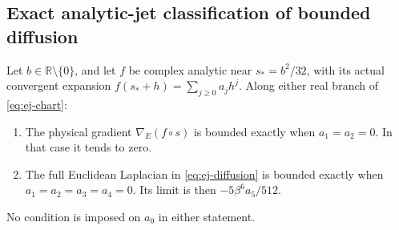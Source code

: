 \subsection{Exact analytic-jet classification of bounded diffusion}

\begin{theorem}\label{thm:ej-jets}
Let $b\in\mathbb R\setminus\{0\}$, and let $f$ be complex analytic
near $s_*=b^2/32$, with its actual convergent expansion
$f(s_*+h)=\sum_{j\ge0}a_jh^j$.
Along either real branch of \eqref{eq:ej-chart}:
\begin{enumerate}
 \item The physical gradient $\nabla_E(f\circ s)$ is bounded exactly
 when $a_1=a_2=0$. In that case it tends to zero.
 \item The full Euclidean Laplacian in \eqref{eq:ej-diffusion} is
 bounded exactly when $a_1=a_2=a_3=a_4=0$. Its limit is then
 $-5\beta^6a_5/512$.
\end{enumerate}
No condition is imposed on $a_0$ in either statement.
\end{theorem}
